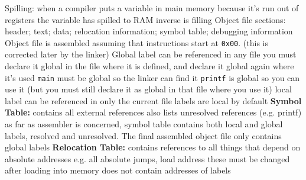 \documentclass[12pt]{article}
\begin{document}
\begin{multicols*}{2}
\begin{flushleft}
\begin{outline}[longenum]
  \1 Spilling: when a compiler puts a variable in main memory because it's run out of registers
    \2 the variable has spilled to RAM
    \2 inverse is filling
  \1 Object file sections: header; text; data; relocation information; symbol table; debugging information
    \2 Object file is assembled assuming that instructions start at \verb|0x00|. (this is corrected later by the linker)
  \1 Global label can be referenced in any file
    \2 you must declare it global in the file where it is defined, and declare it global again where it's used
    \2 \verb|main| must be global so the linker can find it
    \2 \verb|printf| is global so you can use it (but you must still declare it as global in that file where you use it)
  \1 local label can be referenced in only the current file
    \2 labels are local by default
  \1 \textbf{Symbol Table:} contains all external references
    \2 also lists unresolved references (e.g. printf)
    \2 as far as assembler is concerned, symbol table contains both local and global labels, resolved and unresolved.
    \2 The final assembled object file only contains global labels
  \1 \textbf{Relocation Table:} contains references to all things that depend on absolute addresses
    \2 e.g. all absolute jumps, load address
    \2 these must be changed after loading into memory
    \2 does not contain addresses of labels


\end{outline}
\end{flushleft}
\end{multicols*}
\end{document}
